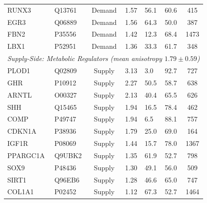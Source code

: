 \begin{table}[h!]
\begin{tabular}{llccllc}
RUNX3 & Q13761 & Demand & 1.57 & 56.1 & 60.6 & 415 \\
EGR3 & Q06889 & Demand & 1.56 & 64.3 & 50.0 & 387 \\
FBN2 & P35556 & Demand & 1.42 & 12.3 & 68.4 & 1473 \\
LBX1 & P52951 & Demand & 1.36 & 33.3 & 61.7 & 348 \\
\midrule
\multicolumn{7}{l}{\textit{Supply-Side: Metabolic Regulators (mean anisotropy $1.79 \pm 0.59$)}} \\
PLOD1 & Q02809 & Supply & 3.13 & 3.0 & 92.7 & 727 \\
GHR & P10912 & Supply & 2.27 & 50.5 & 58.7 & 638 \\
ARNTL & O00327 & Supply & 2.13 & 40.4 & 65.5 & 626 \\
SHH & Q15465 & Supply & 1.94 & 16.5 & 78.4 & 462 \\
COMP & P49747 & Supply & 1.94 & 6.5 & 88.1 & 757 \\
CDKN1A & P38936 & Supply & 1.79 & 25.0 & 69.0 & 164 \\
IGF1R & P08069 & Supply & 1.44 & 15.7 & 78.0 & 1367 \\
PPARGC1A & Q9UBK2 & Supply & 1.35 & 61.9 & 52.7 & 798 \\
SOX9 & P48436 & Supply & 1.30 & 49.1 & 56.0 & 509 \\
SIRT1 & Q96EB6 & Supply & 1.28 & 46.6 & 65.0 & 747 \\
COL1A1 & P02452 & Supply & 1.12 & 67.3 & 52.7 & 1464 \\
\bottomrule
\end{tabular}
\end{table}

